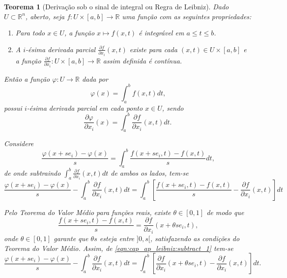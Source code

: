 \documentclass[
	12pt,				%
	openright,			%
    twoside,			%
	a4paper,			%
	english,			%
	french,				%
	spanish,			%
	brazil				%
	]{abntex2}
\makeatletter
\newtheorem{teorema}{Teorema}
\renewenvironment{proof}[1][\proofname]{
	\par\pushQED{\qed}%
	\normalfont \topsep6\p@\@plus6\p@\relax
	\trivlist
	\item\relax
		{\itshape
			#1\@addpunct{.}}\hspace\labelsep\ignorespaces
}{%
	\popQED\endtrivlist\@endpefalse
}
\numberwithin{lema}{chapter}
\numberwithin{teorema}{chapter}
\numberwithin{definicao}{chapter}
\numberwithin{exemplo}{chapter}
\numberwithin{figure}{chapter}
\makeatother
\begin{document}
\begin{apendicesenv}
{	\begin{teorema}[Derivação sob o sinal de integral ou Regra de Leibniz]
		\label{teorema:regra_de_leibniz}
		Dado $U\subset \mathbb{R}^n$, aberto, seja $f:U\times[a,b]\longrightarrow \mathbb{R}$ uma função com as seguintes propriedades:
		\begin{enumerate}
			\item Para todo $x \in U$, a função $x \longmapsto f(x,t)$ é integrável em $a \leqslant t \leqslant b$.
			\item A $i$-ésima derivada parcial $\frac{\partial f}{\partial x_i}(x,t)$ existe para cada $(x,t)\in U\times [a,b]$ e a função $\frac{\partial f}{\partial x_i}:U\times [a,b]\longrightarrow \mathbb{R}$ assim definida é contínua.
		\end{enumerate}
		Então a função $\varphi: U\longrightarrow \mathbb{R}$ dada por
		$$\varphi(x)=\int_a^b f(x,t)dt\text{,}$$
		possui $i$-ésima derivada parcial em cada ponto $x\in U$, sendo
		$$\frac{\partial \varphi}{\partial x_i}(x)=\int_a^b \frac{\partial f}{\partial x_i}(x,t)dt\text{.}$$

		\begin{proof}
			Considere
			$$
			\frac{\varphi(x+se_i)-\varphi(x)}{s}
			=
			\int_a^b \frac{f(x+se_i, t)-f(x,t)}{s} dt\text{,}
			$$
			de onde subtraindo $\displaystyle \int_a^b \frac{\partial f}{\partial x_i}(x,t) dt$ de ambos os lados, tem-se
			\begin{equation}
			\label{eqn:cap_ap_leibniz:subtract_1}
			\frac{\varphi(x+se_i)-\varphi(x)}{s}
			- \int_a^b \frac{\partial f}{\partial x_i}(x,t) dt
			=
			\int_a^b \left [ 
				\frac{f(x+se_i, t)-f(x,t)}{s} 
				- \frac{\partial f}{\partial x_i}(x,t)
			\right ] dt
			\end{equation}
			
			Pelo Teorema do Valor Médio para funções reais, existe $\theta \in [0,1]$ de modo que
			$$
				\frac{f(x+se_i,t)-f(x,t)}{s}=\frac{\partial f}{\partial x_i}(x+\theta s e_i,t)\text{,}
			$$
			onde $\theta \in [0,1]$ garante que $\theta s$ esteja entre $]0, s[$, satisfazendo as condições do Teorema do Valor Médio. Assim, de \eqref{eqn:cap_ap_leibniz:subtract_1} tem-se
			\begin{equation}
				\label{eqn:cap_ap_leibniz:tvm}
				\frac{\varphi(x+se_i)-\varphi(x)}{s}
				- \int_a^b \frac{\partial f}{\partial x_i}(x,t) dt
				=
				\int_a^b \left [
					\frac{\partial f}{\partial x_i}(x+\theta s e_i, t)-\frac{\partial f}{\partial x_i}(x,t)
				\right ] dt\text{.}
			\end{equation}
			

\end{proof}
\end{teorema}}
\end{apendicesenv}
\end{document}
